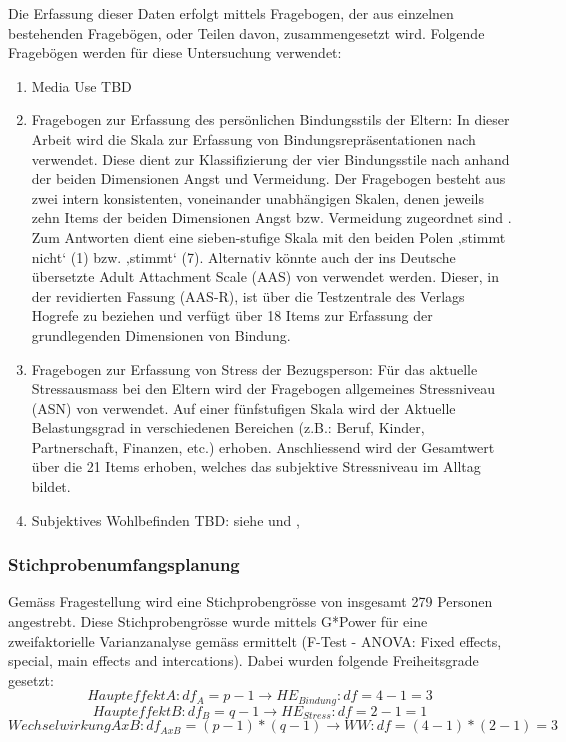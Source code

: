 Die Erfassung dieser Daten erfolgt mittels Fragebogen, der aus einzelnen bestehenden Fragebögen, oder Teilen davon, zusammengesetzt wird. Folgende Fragebögen werden für diese Untersuchung verwendet:
\begin{enumerate}
    \item Media Use TBD
    \item Fragebogen zur Erfassung des persönlichen Bindungsstils der Eltern: 
In dieser Arbeit wird die Skala zur Erfassung von Bindungsrepräsentationen nach  verwendet. Diese dient zur Klassifizierung der vier Bindungsstile nach  anhand der beiden Dimensionen Angst und Vermeidung. Der Fragebogen besteht aus zwei intern konsistenten, voneinander unabhängigen Skalen, denen jeweils zehn Items der beiden Dimensionen Angst bzw. Vermeidung zugeordnet sind \cite{Baadte2006}. Zum Antworten dient eine sieben-stufige Skala mit den beiden Polen ‚stimmt nicht‘ (1) bzw. ‚stimmt‘ (7). Alternativ könnte auch der ins Deutsche übersetzte Adult Attachment Scale (AAS) von  verwendet werden. Dieser, in der revidierten Fassung (AAS-R),  ist über die Testzentrale des Verlags Hogrefe zu beziehen und verfügt über 18 Items zur Erfassung der grundlegenden Dimensionen von Bindung.
    \item Fragebogen zur Erfassung von Stress der Bezugsperson: Für das aktuelle Stressausmass bei den Eltern wird der Fragebogen allgemeines Stressniveau (ASN) von  verwendet. Auf einer fünfstufigen Skala wird der Aktuelle Belastungsgrad in verschiedenen Bereichen (z.B.: Beruf, Kinder, Partnerschaft, Finanzen, etc.) erhoben. Anschliessend wird der Gesamtwert über die 21 Items erhoben, welches das subjektive Stressniveau im Alltag bildet.
    
    \item Subjektives Wohlbefinden TBD: siehe \cite{AmericanAcademyofPediatrics2013} und \cite{Plowman2014}, \cite{Nikken2014}
\end{enumerate}

\subsubsection{Stichprobenumfangsplanung}
Gemäss Fragestellung wird eine Stichprobengrösse von insgesamt 279 Personen angestrebt. Diese Stichprobengrösse wurde mittels G*Power \cite{Faul2009} für eine zweifaktorielle Varianzanalyse gemäss  ermittelt (F-Test - ANOVA: Fixed effects, special, main effects and intercations). Dabei wurden folgende Freiheitsgrade gesetzt:
\begin{equation}
    Haupteffekt A: df_{A} = p-1 \rightarrow HE_{Bindung}: df = 4-1=3
\end{equation}
\begin{equation}
    Haupteffekt B: df_{B} = q-1 \rightarrow HE_{Stress}: df = 2-1=1
\end{equation}
\begin{equation}
    Wechselwirkung AxB: df_{AxB} = (p-1)*(q-1) \rightarrow WW: df = (4-1)*(2-1)=3
\end{equation}\\

